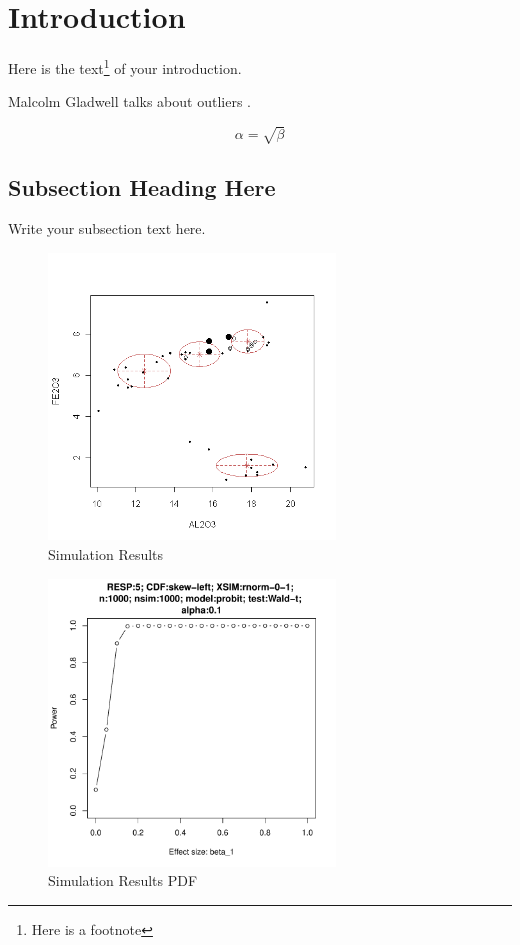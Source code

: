 \documentclass{article}
\title{\hmwkCourse \\ \hmwkTitle}
\author{\hmwkAuthor \\ \hmwkEmail \\ \hmwkWSU \\[0.5in] \hmwkInstructor }
\date{\hmwkDate}
\begin{document}
\maketitle


\section{Introduction}
Here is the text\footnote{Here is a footnote} of your introduction.

Malcolm Gladwell talks about outliers \citep{Gladwell:2008}.

\begin{equation}
    \label{simple_equation}
    \alpha = \sqrt{ \beta }
\end{equation}

\subsection{Subsection Heading Here}
Write your subsection text here.

\begin{figure}
    \centering
    \includegraphics[width=3.0in]{graphics/myfigure}
    \caption{Simulation Results}
    \label{simulationfigure}
\end{figure}

\begin{figure}
    \centering
    \includegraphics[width=3.0in]{graphics/pdffigure}
    \caption{Simulation Results PDF}
    \label{simulationfigurepdf}
\end{figure}
\end{document}
